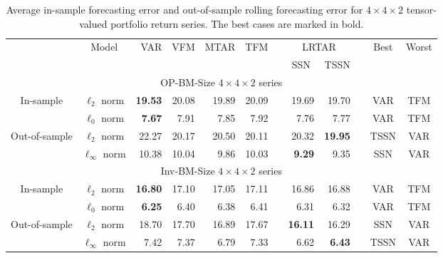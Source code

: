 \documentclass[12pt]{article}
\begin{document}
\begin{table}
	\begin{center}
		\begin{tabular}{cc|rrrrrrrccc}
			\hline\hline
			&\multirow{2}{*}{Model} & \multirow{2}{*}{VAR} & \multirow{2}{*}{VFM} & \multirow{2}{*}{MTAR} & \multirow{2}{*}{TFM} && \multicolumn{2}{c}{LRTAR} && \multirow{2}{*}{Best} & \multirow{2}{*}{Worst}\\
			\cline{8-9}
			&&&&&&& \multicolumn{1}{c}{SSN} & TSSN &&&\\
			\hline
			\multicolumn{12}{c}{OP-BM-Size $4\times 4\times 2$ series}\\
			\hline
			\multirow{2}{*}{In-sample}& $\ell_2$ norm & \bf{19.53} & 20.08 & 19.89 & 20.09 && 19.69 & 19.70 && VAR & TFM\\
			& $\ell_0$ norm & \bf{7.67} & 7.91 & 7.85 & 7.92 && 7.76 & 7.77 && VAR & TFM\\
			\hline
			\multirow{2}{*}{Out-of-sample}& $\ell_2$ norm & 22.27 & 20.17 & 20.50 & 20.11 && 20.32 & \bf{19.95} && TSSN & VAR\\
			& $\ell_\infty$ norm & 10.38 & 10.04 & 9.86 & 10.03 && \bf{9.29} & 9.35 && SSN & VAR\\
			\hline
			\multicolumn{12}{c}{Inv-BM-Size $4\times 4\times 2$ series}\\
			\hline
			\multirow{2}{*}{In-sample}& $\ell_2$ norm & \bf{16.80} & 17.10 & 17.05 & 17.11 && 16.86 & 16.88  && VAR & TFM\\
			& $\ell_0$ norm & \bf{6.25} & 6.40 & 6.38 & 6.41 && 6.31 & 6.32  && VAR & TFM\\
			\hline
			\multirow{2}{*}{Out-of-sample} & $\ell_2$ norm & 18.70 & 17.70 & 16.89 & 17.67 && \bf{16.11} & 16.29 && SSN & VAR\\
			& $\ell_\infty$ norm & 7.42 & 7.37 & 6.79 & 7.33 && 6.62 & \bf{6.43} && TSSN & VAR\\
			\hline
		\end{tabular}
		\caption{Average in-sample forecasting error and out-of-sample rolling forecasting error for $4\times 4\times 2$ tensor-valued portfolio return series. The best cases are marked in bold.}
		\label{tbl:in-sample-error2}
	\end{center}
\end{table}
\end{document}
